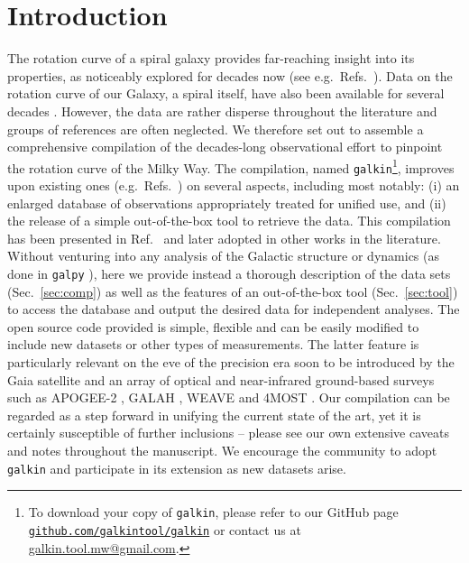 \documentclass[twocolumn,prd,reprint,preprintnumbers,amsmath,amssymb,superscriptaddress,nofootinbib]{revtex4}
\begin{document}
\section{Introduction}
\par The rotation curve of a spiral galaxy provides far-reaching insight into its properties, as noticeably explored for decades now (see e.g.~Refs.~\cite{1970ApJ...160..811F,1973A&A....26..483R,1978PhDT.......195B,1978ApJ...225L.107R, Persic:1995tc}). Data on the rotation curve of our Galaxy, a spiral itself, have also been available for several decades \cite{Blitz1979,BurtonGordon1978,Clemens1985,Knapp1985,Fich1989,Pont1994}. However, the data are rather disperse throughout the literature and groups of references are often neglected. We therefore set out to assemble a comprehensive compilation of the decades-long observational effort to pinpoint the rotation curve of the Milky Way. The compilation, named \texttt{galkin}\footnote{To download your copy of \texttt{galkin},  please refer to our GitHub page  \href{https://github.com/galkintool/galkin}{\tt github.com/galkintool/galkin} or contact us at \href{mailto:galkin.tool.mw@gmail.com}{galkin.tool.mw@gmail.com}.}, improves upon existing ones (e.g.~Refs.~\cite{Sofue2009,Bhattacharjee2014}) on several aspects, including most notably: (i) an enlarged database of observations appropriately treated for unified use, and (ii) the release of a simple out-of-the-box tool to retrieve the data. This compilation has been presented in Ref.~\cite{2015NatPh..11..245I} and later adopted in other works in the literature. Without venturing into any analysis of the Galactic structure or dynamics (as done in \texttt{galpy} \cite{2015ApJS..216...29B}), here we provide instead a thorough description of the data sets (Sec.~\ref{sec:comp}) as well as the features of an out-of-the-box tool (Sec.~\ref{sec:tool}) to access the database and output the desired data for independent analyses. The open source code provided is simple, flexible and can be easily modified to include new datasets or other types of measurements. The latter feature is particularly relevant on the eve of the precision era soon to be introduced by the Gaia satellite \cite{2012Ap&SS.341...31D} and an array of optical and near-infrared ground-based surveys such as APOGEE-2 \cite{apogee2site,APOGEE}, GALAH \cite{2015MNRAS.449.2604D}, WEAVE \cite{weavesite} and 4MOST \cite{2012SPIE.8446E..0TD}. Our compilation can be regarded as a step forward in unifying the current state of the art, yet it is certainly susceptible of further inclusions -- please see our own extensive caveats and notes throughout the manuscript. 
We encourage the community to adopt \texttt{galkin} and participate in its extension as new datasets arise.
\end{document}

